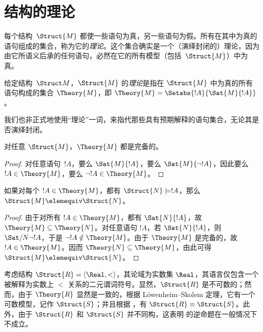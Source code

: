\documentclass[../../../include/open-logic-section]{subfiles}
\begin{document}

\section{结构的理论}

每个结构~$\Struct{M}$ 都使一些语句为真，另一些语句为假。所有在其中为真的语句组成的集合，称为它的\emph{理论}。这个集合确实是一个（演绎封闭的）理论，因为由它所语义后承的任何语句，必然在它的所有模型（包括~$\Struct{M}$）中为真。

\begin{defn}
  给定结构~$\Struct M$，$\Struct{M}$ 的\emph{理论}是指在 $\Struct{M}$ 中为真的所有语句构成的集合 $\Theory{M}$，即 $\Theory{M} =
  \Setabs{!A}{\Sat{M}{!A}}$。
\end{defn}

我们也非正式地使用“理论”一词，来指代那些具有预期解释的语句集合，无论其是否演绎封闭。

\begin{prop}
对任意 $\Struct{M}$，$\Theory{M}$ 都是完备的。
\end{prop}

\begin{proof}
对任意语句~$!A$，要么 $\Sat{M}{!A}$，要么 $\Sat{M}{\lnot !A}$，因此要么 $!A \in \Theory{M}$，要么 $\lnot !A \in \Theory{M}$。
\end{proof}

\begin{prop}
  如果对每个 $!A \in \Theory{M}$，都有 $\Struct{N} \models !A$，那么 $\Struct{M} \elemequiv \Struct{N}$。
\end{prop}

\begin{proof}
由于对所有 $!A \in \Theory{M}$，都有 $\Sat{N}{!A}$，故 $\Theory{M} \subseteq
\Theory{N}$。对任意语句 $!A$，若 $\Sat{N}{!A}$，则 $\Sat/{N}{\lnot !A}$，于是 $\lnot !A
\notin \Theory{M}$。由于 $\Theory{M}$ 是完备的，故 $!A \in
\Theory{M}$。因而 $\Theory{N} \subseteq \Theory{M}$，由此可得 $\Struct{M} \elemequiv \Struct{N}$。
\end{proof}

\begin{rem}
  考虑结构 $\Struct{R} = \langle\Real, <\rangle$，其论域为实数集 $\Real$，其语言仅包含一个被解释为实数上 $<$ 关系的二元谓词符号。显然，$\Struct{R}$ 是不可数的；然而，由于 $\Theory{R}$ 显然是一致的，根据 Löwenheim--Skolem 定理，它有一个可数模型，记作 $\Struct{S}$；并且根据 ，有 $\Struct{R}
  \equiv \Struct{S}$。此外，由于 $\Struct{R}$ 和 $\Struct{S}$ 并不同构，这表明  的逆命题在一般情况下不成立。
\end{rem}
\end{document}
